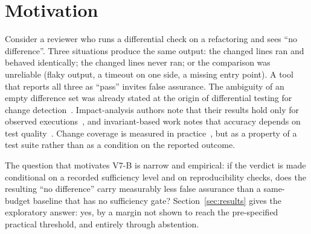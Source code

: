 \section{Motivation}\label{sec:motivation}
Consider a reviewer who runs a differential check on a refactoring and sees ``no difference''. Three situations produce the same output: the changed lines ran and behaved identically; the changed lines never ran; or the comparison was unreliable (flaky output, a timeout on one side, a missing entry point). A tool that reports all three as ``pass'' invites false assurance. The ambiguity of an empty difference set was already stated at the origin of differential testing for change detection~\cite{evans2007}. Impact-analysis authors note that their results hold only for observed executions~\cite{law2003,orso2003}, and invariant-based work notes that accuracy depends on test quality~\cite{ernst2001}. Change coverage is measured in practice~\cite{hilton2018a}, but as a property of a test suite rather than as a condition on the reported outcome.

The question that motivates V7-B is narrow and empirical: if the verdict is made conditional on a recorded sufficiency level and on reproducibility checks, does the resulting ``no difference'' carry measurably less false assurance than a same-budget baseline that has no sufficiency gate? Section~\ref{sec:results} gives the exploratory answer: yes, by a margin not shown to reach the pre-specified practical threshold, and entirely through abstention.
